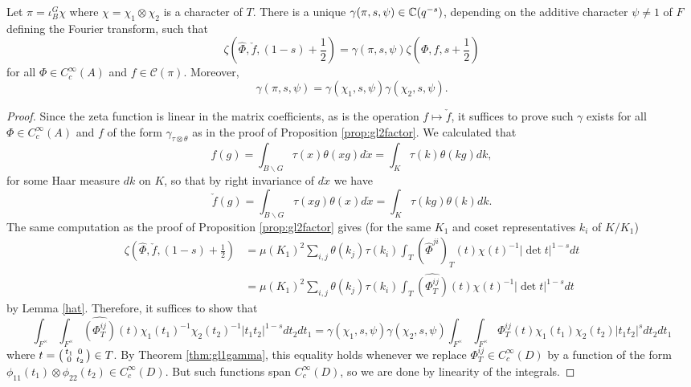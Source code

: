 \begin{prop}\label{prop:gl2gamma}
    Let $\pi = \iota_B^G \chi$ where $\chi=\chi_1\otimes \chi_2$ is a character of $T$. There is a unique $\gamma(\pi,s,\psi) \in \mathbb{C}(q^{-s})$, depending on the additive character $\psi \neq 1$ of $F$ defining the Fourier transform, such that 
    $$\zeta(\hat{\Phi},\check{f},(1-s)+\frac{1}{2}) = \gamma(\pi,s,\psi) \zeta(\Phi,f,s+\frac{1}{2})$$
    for all $\Phi \in C_c^\infty(A)$ and $f \in \mathcal C(\pi)$. Moreover, 
    $$\gamma(\pi,s,\psi) = \gamma(\chi_1,s,\psi)\gamma(\chi_2,s,\psi).$$
\end{prop}
\begin{proof}
    Since the zeta function is linear in the matrix coefficients, as is the operation $f \mapsto \check{f}$, it suffices to prove such $\gamma$ exists for all $\Phi \in C_c^\infty(A)$ and $f$ of the form $\gamma_{\tau \otimes \theta}$ as in the proof of Proposition \ref{prop:gl2factor}. We calculated that 
    $$f(g) = \int_{B \backslash G} \tau(x)\theta(xg) d\dot{x} = \int_K \tau(k)\theta(kg)dk,$$ for some Haar measure $dk$ on $K$, so that by right invariance of $d\dot{x}$ we have 
    $$\check{f}(g) = \int_{B \backslash G}\tau(xg)\theta(x) d\dot{x} = \int_K \tau(kg)\theta(k)dk.$$ The same computation as the proof of Proposition \ref{prop:gl2factor} gives (for the same $K_1$ and coset representatives $k_i$ of $K/K_1$)
    \begin{equation*}
        \begin{split}
            \zeta(\hat{\Phi},\check{f},(1-s)+\frac{1}{2}) &= \mu(K_1)^2 \sum\limits_{i,j} \theta(k_j)\tau(k_i) \int_T (\hat\Phi^{ji})_T(t) \chi(t)^{-1} |\det t|^{1-s} dt \\
            &= \mu(K_1)^2 \sum\limits_{i,j} \theta(k_j)\tau(k_i) \int_T \widehat{(\Phi_T^{ij})}(t) \chi(t)^{-1} |\det t|^{1-s} dt
        \end{split}
    \end{equation*}
    by Lemma \ref{hat}. Therefore, it suffices to show that 
    $$\int_{F^\times}\int_{F^\times} \widehat{(\Phi^{ij}_T)}(t)\chi_1(t_1)^{-1}\chi_2(t_2)^{-1}|t_1t_2|^{1-s} dt_2dt_1 =  \gamma(\chi_1,s,\psi)\gamma(\chi_2,s,\psi) \int_{F^\times} \int_{F^\times}\Phi^{ij}_T(t)\chi_1(t_1)\chi_2(t_2) |t_1t_2|^s dt_2dt_1$$
    where $t = \begin{psmallmatrix}
        t_1 &0\\0&t_2
    \end{psmallmatrix} \in T$. By Theorem \ref{thm:gl1gamma}, this equality holds whenever we replace $\Phi^{ij}_T \in C_c^\infty(D)$ by a function of the form $\phi_{11}(t_1) \otimes \phi_{22}(t_2) \in C_c^\infty(D)$. But such functions span $C_c^\infty(D)$, so we are done by linearity of the integrals.

\end{proof}

